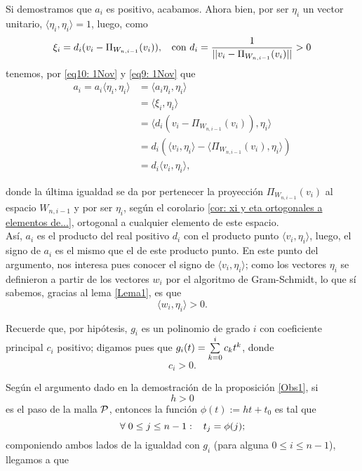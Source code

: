\begin{itemize}
Si demostramos que $a_{i}$ es positivo, acabamos.
Ahora bien, por ser $\eta_{i}$ un vector unitario,
$\langle\eta_{i} , \eta_{i} \rangle =1$, luego,
como 
\begin{equation}
\label{eq9: 1Nov}
\xi_{i}= d_{i} (v_{i}-\Pi_{W_{n,i-1}}(v_{i})),
\hspace{0.2cm} \text{ con } d_{i}= \frac{1}{||v_{i}-\Pi_{W_{n,i-1}}(v_{i})||}
>0
\end{equation}
tenemos, por \eqref{eq10: 1Nov} y
\eqref{eq9: 1Nov} que
\begin{align*}
a_{i} =  a_{i} \langle\eta_{i} , \eta_{i} \rangle &
= \langle a_{i}\eta_{i} , \eta_{i} \rangle \\
& = 
\langle \xi_{i} , \eta_{i} \rangle \\
& =  
\langle  d_{i} (v_{i}-\Pi_{W_{n,i-1}}(v_{i})), \eta_{i} \rangle \\
& =  d_{i} \left( \langle  v_{i} , \eta_{i} \rangle -
\langle \Pi_{W_{n,i-1}}(v_{i}) , \eta_{i} \rangle  \right) \\
& = d_{i} \langle  v_{i} , \eta_{i} \rangle,
\end{align*}

donde la última igualdad se da por pertenecer la proyección
$\Pi_{W_{n,i-1}}(v_{i})$ al espacio $W_{n,i-1}$ y por ser
$\eta_{i}$,
según el corolario \ref{cor: xi y eta ortogonales a elementos de...},
ortogonal a cualquier elemento de este espacio. \\

Así, $a_{i}$ es el producto del 
real positivo $d_{i}$
con el producto punto
$\langle  v_{i} , \eta_{i} \rangle$,
luego, el signo de $a_{i}$ es el mismo que el de este 
producto punto. 
En este punto del argumento,
nos interesa pues conocer el signo de
$\langle  v_{i} , \eta_{i} \rangle$; como los vectores $\eta_{i}$
se definieron a partir de los vectores $w_{i}$ por el 
algoritmo de Gram-Schmidt, 
lo que sí sabemos, gracias al lema
\ref{Lema1}, es que 
\begin{equation}
\label{eq1: 1Nov}
\langle  w_{i} , \eta_{i} \rangle >0.
\end{equation}

Recuerde que, por hipótesis,
$g_{i}$ es un polinomio de grado $i$
con coeficiente principal $c_{i}$ positivo; digamos pues que
$g_{i}(t)= \sum\limits_{k=0}^{i}c_{k}t^{k}$,
donde 
\begin{equation}
\label{eq2: 1Nov}
c_{i}>0.
\end{equation}

Según el argumento dado en la demostración de 
la proposición \ref{Obs1}, si 
\begin{equation}
\label{eq3: 1Nov}
h>0
\end{equation} es el paso
de la malla $\mathcal{P}$, entonces la función
$\phi(t):= ht+t_{0}$ es tal que
\[
\forall \hspace{0.1cm} 0 \leq j \leq n-1: \hspace{0.3cm} t_{j}= \phi(j);
\]
componiendo ambos lados de la igualdad con $g_{i}$
(para alguna $0 \leq i \leq n-1$), llegamos a que


\end{itemize}
